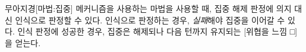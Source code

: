 \documentclass{report}
\begin{document}
	\begin{story}{무아지경}{[마법:집중]}
		 메커니즘을 사용하는 마법을 사용할 때, 집중 해제 판정에 의지 대신 인식으로 판정할 수 있다. 인식으로 판정하는 경우, \emph{실패}해야 집중을 이어갈 수 있다. 인식 판정에 성공한 경우, 집중은 해제되나 다음 턴까지 유지되는 [위협을 느낌 □]을 얻는다.
		
	\end{story}
\end{document}
